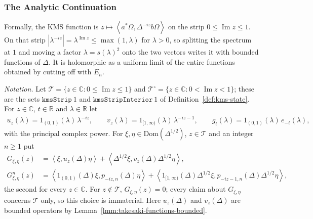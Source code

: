\subsubsection{The Analytic Continuation}

Formally, the KMS function is $z \mapsto \left< a^*\Omega, \Delta^{-iz}b\Omega \right>$ on the strip $0 \le \operatorname{Im} z \le 1$. On that strip $|\lambda^{-iz}| = \lambda^{\operatorname{Im} z} \le \max(1, \lambda)$ for $\lambda > 0$, so splitting the spectrum at $1$ and moving a factor $\lambda = s(\lambda)^2$ onto the two vectors writes it with bounded functions of $\Delta$. It is holomorphic as a uniform limit of the entire functions obtained by cutting off with $E_n$.

\emph{Notation.} Let $\mathcal{T} = \{ z \in \mathbb{C} : 0 \le \operatorname{Im} z \le 1 \}$ and $\mathcal{T}^\circ = \{ z \in \mathbb{C} : 0 < \operatorname{Im} z < 1 \}$; these are the sets $\texttt{kmsStrip}\ 1$ and $\texttt{kmsStripInterior}\ 1$ of Definition~\ref{def:kms-state}. For $z \in \mathbb{C}$, $t \in \mathbb{R}$ and $\lambda \in \mathbb{R}$ let
\begin{align}
    u_z(\lambda) = 1_{(0,1)}(\lambda)\,\lambda^{-iz}, \qquad v_z(\lambda) = 1_{[1,\infty)}(\lambda)\,\lambda^{-iz-1}, \qquad g_t(\lambda) = 1_{(0,1)}(\lambda)\,e_{-t}(\lambda),
\end{align}
with the principal complex power. For $\xi, \eta \in \text{Dom}(\Delta^{1/2})$, $z \in \mathcal{T}$ and an integer $n \ge 1$ put
\begin{align}
    G_{\xi,\eta}(z) &= \left< \xi, u_z(\Delta)\eta \right> + \left< \Delta^{1/2}\xi, v_z(\Delta)\Delta^{1/2}\eta \right>, \\
    G^n_{\xi,\eta}(z) &= \left< 1_{(0,1)}(\Delta)\xi, p_{-iz,n}(\Delta)\eta \right> + \left< 1_{[1,\infty)}(\Delta)\Delta^{1/2}\xi, p_{-iz-1,n}(\Delta)\Delta^{1/2}\eta \right>,
\end{align}
the second for every $z \in \mathbb{C}$. For $z \notin \mathcal{T}$, $G_{\xi,\eta}(z) = 0$; every claim about $G_{\xi,\eta}$ concerns $\mathcal{T}$ only, so this choice is immaterial. Here $u_z(\Delta)$ and $v_z(\Delta)$ are bounded operators by Lemma~\ref{lmm:takesaki-functions-bounded}.

